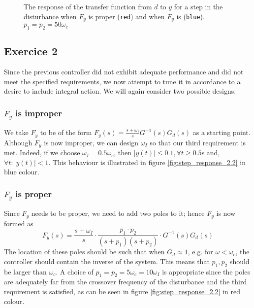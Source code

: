 \begin{figure}[H]\centering
  \scalebox{0.8}{}
  \caption{The response of the transfer function from $d$ to $y$ for a step in
    the disturbance when $F_y$ is proper (\texttt{red}) and when $F_y$ is
    (\texttt{blue}). $p_1 = p_2 = 50\omega_c$}
  \label{fig:step_response_2.1}
\end{figure}


\subsection{Exercice 2}

Since the previous controller did not exhibit adequate performance and did not
meet the specified requirements, we now attempt to tune it in accordance to a
desire to include integral action. We will again consider two possible designs.

\subsubsection{$F_y$ is improper}

We take $F_y$ to be of the form $F_y(s) = \frac{s+\omega_I}{s}G^{-1}(s)G_d(s)$
as a starting point. Although $F_y$ is now improper, we can design $\omega_I$ so
that our third requirement is met. Indeed, if we choose
$\omega_I = 0.5 \omega_c$, then $|y(t)| \leq 0.1, \forall t \geq 0.5$s and,
$\forall t: |y(t)| < 1$. This behaviour is illustrated in figure
\ref{fig:step_response_2.2} in blue colour.


\subsubsection{$F_y$ is proper}

Since $F_y$ needs to be proper, we need to add two poles to it; hence $F_y$ is
now formed as
$$F_y(s) = \dfrac{s+\omega_I}{s} \cdot \dfrac{p_1 \cdot p_2}{(s+p_1)(s+p_2)} \cdot G^{-1}(s)G_d(s)$$
The location of these poles should be such that when $G_d \approx 1$, e.g.
for $\omega < \omega_c$, the controller should contain the inverse of the
system. This means that $p_1,p_2$ should be larger than $\omega_c$. A choice of
$p_1 = p_2 = 5\omega_c = 10\omega_I$ is appropriate since the poles are
adequately far from the crossover frequency of the disturbance and the third
requirement is satisfied, as can be seen in figure \ref{fig:step_response_2.2}
in red colour.



